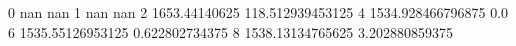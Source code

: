 0 nan nan
1 nan nan
2 1653.44140625 118.512939453125
4 1534.928466796875 0.0
6 1535.55126953125 0.622802734375
8 1538.13134765625 3.202880859375
